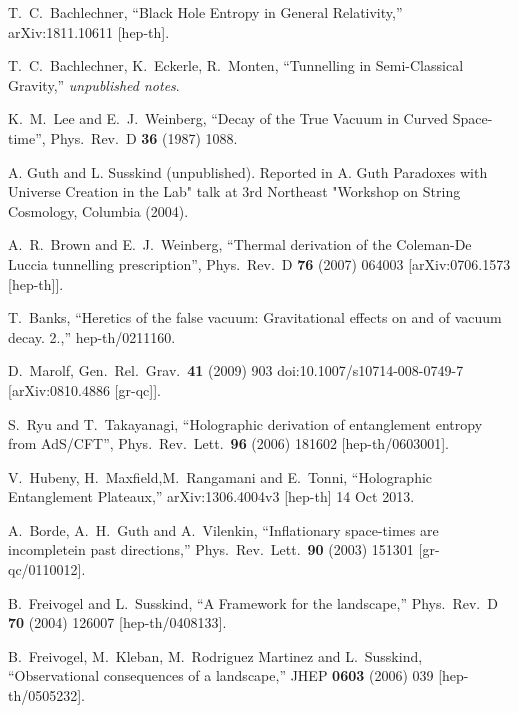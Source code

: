 \documentclass[11pt,a4paper]{article}
\begin{document}
\begin{thebibliography}{99}
  T.~C.~Bachlechner,
  ``Black Hole Entropy in General Relativity,''
  arXiv:1811.10611 [hep-th].
  
  T.~C.~Bachlechner, K.~Eckerle, R.~Monten,
  ``Tunnelling in Semi-Classical Gravity,''
  \textit{unpublished notes}.
  
  K.~M.~Lee and E.~J.~Weinberg,
  ``Decay of the True Vacuum in Curved Space-time'',
  Phys.\ Rev.\ D {\bf 36} (1987) 1088.

A. Guth and L. Susskind (unpublished). Reported in A. Guth Paradoxes with Universe Creation in the Lab" talk at 3rd Northeast "Workshop on String Cosmology, Columbia (2004).

  A.~R.~Brown and E.~J.~Weinberg,
  ``Thermal derivation of the Coleman-De Luccia tunnelling prescription'',
  Phys.\ Rev.\ D {\bf 76} (2007) 064003
  [arXiv:0706.1573 [hep-th]].
  
  T.~Banks,
  ``Heretics of the false vacuum: Gravitational effects on and of vacuum decay. 2.,''
  hep-th/0211160.
  
  D.~Marolf,
  Gen.\ Rel.\ Grav.\  {\bf 41} (2009) 903
  doi:10.1007/s10714-008-0749-7
  [arXiv:0810.4886 [gr-qc]].
  
  S.~Ryu and T.~Takayanagi,
  ``Holographic derivation of entanglement entropy from AdS/CFT'',
  Phys.\ Rev.\ Lett.\  {\bf 96} (2006) 181602
  [hep-th/0603001].
  
  V.~Hubeny, H.~Maxfield,M.~Rangamani and E.~Tonni,
  ``Holographic Entanglement Plateaux,''
  arXiv:1306.4004v3
  [hep-th] 14 Oct 2013.
  
  A.~Borde, A.~H.~Guth and A.~Vilenkin,
  ``Inflationary space-times are incompletein past directions,''
  Phys.\ Rev.\ Lett.\  {\bf 90} (2003) 151301
  [gr-qc/0110012].
  
  B.~Freivogel and L.~Susskind,
  ``A Framework for the landscape,''
  Phys.\ Rev.\ D {\bf 70} (2004) 126007
  [hep-th/0408133].
  
  B.~Freivogel, M.~Kleban, M.~Rodriguez Martinez and L.~Susskind,
  ``Observational consequences of a landscape,''
  JHEP {\bf 0603} (2006) 039
  [hep-th/0505232].
  

\end{thebibliography}
\end{document}
